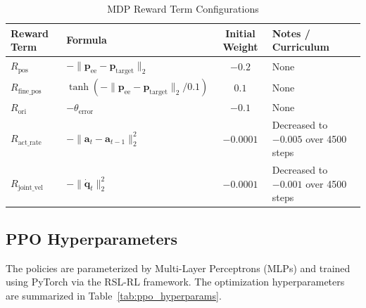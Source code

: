 \begin{table}[htbp]
  \centering
  \caption{MDP Reward Term Configurations}
  \label{tab:reward_functions}
  \begin{tabular}{llcl}
    \toprule
    Reward Term & Formula & Initial Weight & Notes / Curriculum \\
    \midrule
    $R_{\mathrm{pos}}$ & $-\|\boldsymbol{p}_{\mathrm{ee}} - \boldsymbol{p}_{\mathrm{target}}\|_2$ & $-0.2$ & None \\
    $R_{\mathrm{fine\_pos}}$ & $\tanh(-\|\boldsymbol{p}_{\mathrm{ee}} - \boldsymbol{p}_{\mathrm{target}}\|_2 / 0.1)$ & $0.1$ & None \\
    $R_{\mathrm{ori}}$ & $-\theta_{\mathrm{error}}$ & $-0.1$ & None \\
    $R_{\mathrm{act\_rate}}$ & $-\|\boldsymbol{a}_t - \boldsymbol{a}_{t-1}\|_2^2$ & $-0.0001$ & Decreased to $-0.005$ over 4500 steps \\
    $R_{\mathrm{joint\_vel}}$ & $-\|\dot{\boldsymbol{q}}_t\|_2^2$ & $-0.0001$ & Decreased to $-0.001$ over 4500 steps \\
    \bottomrule
  \end{tabular}
\end{table}

\subsection{PPO Hyperparameters}
The policies are parameterized by Multi-Layer Perceptrons (MLPs) and trained using PyTorch via the RSL-RL framework. The optimization hyperparameters are summarized in Table~\ref{tab:ppo_hyperparams}.


